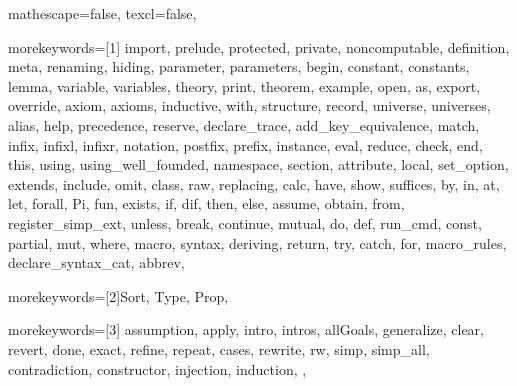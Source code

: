 
 {

mathescape=false,
texcl=false,

morekeywords=[1]{
import, prelude, protected, private, noncomputable, definition, meta, renaming,
hiding, parameter, parameters, begin, constant, constants,
lemma, variable, variables, theory,
print, theorem, example,
open, as, export, override, axiom, axioms, inductive, with,
structure, record, universe, universes,
alias, help, precedence, reserve, declare_trace, add_key_equivalence,
match, infix, infixl, infixr, notation, postfix, prefix, instance,
eval, reduce, check, end, this,
using, using_well_founded, namespace, section,
attribute, local, set_option, extends, include, omit, class,
raw, replacing,
calc, have, show, suffices, by, in, at, let, forall, Pi, fun,
exists, if, dif, then, else, assume, obtain, from, register_simp_ext, unless, break, continue,
mutual, do, def, run_cmd, const,
partial, mut, where, macro, syntax, deriving,
return, try, catch, for, macro_rules, declare_syntax_cat, abbrev},

morekeywords=[2]{Sort, Type, Prop},

morekeywords=[3]{
assumption,
apply, intro, intros, allGoals,
generalize, clear, revert, done, exact,
refine, repeat, cases, rewrite, rw,
simp, simp_all, contradiction,
constructor, injection,
induction,
},


}
